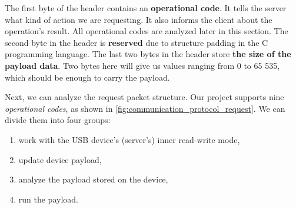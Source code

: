 The first byte of the header contains an \textbf{operational code}. It tells the server what kind of action we are requesting. It also informs the client about the operation's result. All operational codes are analyzed later in this section. The second byte in the header is \textbf{reserved} due to structure padding in the C programming language\cite{KernighanBrianW.1988TCpl}. The last two bytes in the header store \textbf{the size of the payload data}. Two bytes here will give us values ranging from 0 to 65 535, which should be enough to carry the payload.

Next, we can analyze the request packet structure. Our project supports nine \emph{operational codes}, as shown in \autoref{fig:communication_protocol_request}. We can divide them into four groups:

\begin{enumerate}
    \item work with the USB device's (server's) inner read-write mode,
    \item update device payload,
    \item analyze the payload stored on the device,
    \item run the payload.
\end{enumerate}

